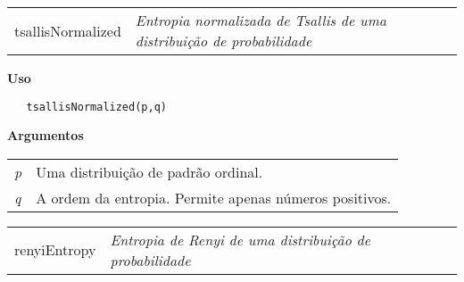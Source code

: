 \newpage

\hrulefill   

\begin{table}[!ht]
\begin{center}
\begin{tabularx}{\textwidth}{ X X}
\hspace{0.5cm} tsallisNormalized & \textit{Entropia normalizada de Tsallis de uma distribuição de probabilidade}\\
\end{tabularx}
\end{center}
\end{table} 

\vspace{-0.5cm}

\hrulefill  

\vspace{0.5cm}

\textbf{Uso}

\begin{lstlisting}
   tsallisNormalized(p,q)
\end{lstlisting}

\vspace{0.5cm}

\textbf{Argumentos}

\begin{table}[!ht]
\begin{center}
\begin{tabularx}{\textwidth}{X X}
\hspace{0.5cm} \textit{p} \vspace{0.5cm}& Uma distribuição de padrão ordinal.\vspace{0.5cm}\\
\hspace{0.5cm} \textit{q} \vspace{0.5cm}&  A ordem da entropia. Permite apenas números positivos.\vspace{0.5cm}\\
\end{tabularx}
\end{center}
\end{table} 


\hrulefill   

\begin{table}[!ht]
\begin{center}
\begin{tabularx}{\textwidth}{ X X}
\hspace{0.5cm} renyiEntropy & \textit{Entropia de Renyi de uma distribuição de probabilidade}\\
\end{tabularx}
\end{center}
\end{table} 

